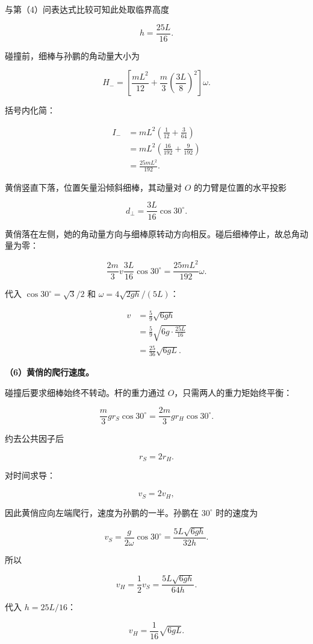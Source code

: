 \documentclass[12pt,a4paper,UTF8]{ctexart}
\begin{document}
与第（4）问表达式比较可知此处取临界高度

\[h=\frac{25L}{16}.\]

碰撞前，细棒与孙鹏的角动量大小为

\[H_-=\left[\frac{mL^2}{12}+\frac m3\left(\frac{3L}{8}\right)^2\right]\omega.\]

括号内化简：

\[
\begin{aligned}
I_-&=mL^2\left(\frac1{12}+\frac{3}{64}\right)\\
&=mL^2\left(\frac{16}{192}+\frac9{192}\right)\\
&=\frac{25mL^2}{192}.
\end{aligned}
\]

黄俏竖直下落，位置矢量沿倾斜细棒，其动量对 \(O\) 的力臂是位置的水平投影

\[d_\perp=\frac{3L}{16}\cos30^\circ.\]

黄俏落在左侧，她的角动量方向与细棒原转动方向相反。碰后细棒停止，故总角动量为零：

\[\frac{2m}{3}v\frac{3L}{16}\cos30^\circ
=\frac{25mL^2}{192}\omega.\]

代入 \(\cos30^\circ=\sqrt3/2\) 和 \(\omega=4\sqrt{2gh}/(5L)\)：

\[
\begin{aligned}
v
&=\frac{5}{9}\sqrt{6gh}\\
&=\frac59\sqrt{6g\cdot\frac{25L}{16}}\\
&=\boxed{\frac{25}{36}\sqrt{6gL}}.
\end{aligned}
\]

\textbf{（6）黄俏的爬行速度。}

碰撞后要求细棒始终不转动。杆的重力通过 \(O\)，只需两人的重力矩始终平衡：

\[\frac m3gr_S\cos30^\circ
=\frac{2m}{3}gr_H\cos30^\circ.\]

约去公共因子后

\[r_S=2r_H.\]

对时间求导：

\[v_S=2v_H,\]

因此黄俏应向左端爬行，速度为孙鹏的一半。孙鹏在 \(30^\circ\) 时的速度为

\[v_S=\frac{g}{2\omega}\cos30^\circ
=\frac{5L\sqrt{6gh}}{32h}.\]

所以

\[v_H=\frac12v_S=\frac{5L\sqrt{6gh}}{64h}.\]

代入 \(h=25L/16\)：

\[\boxed{v_H=\frac1{16}\sqrt{6gL}}.\]
\end{document}

